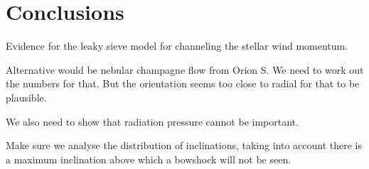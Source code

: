 
\section{Conclusions}
\label{sec:conclusions-proplyd}

Evidence for the leaky sieve model for channeling the stellar wind
momentum.

Alternative would be nebular champagne flow from Orion S.  We need to
work out the numbers for that. But the orientation seems too close to
radial for that to be plausible.

We also need to show that radiation pressure cannot be important.

Make sure we analyse the distribution of inclinations, taking into
account there is a maximum inclination above which a bowshock will not
be seen. 
